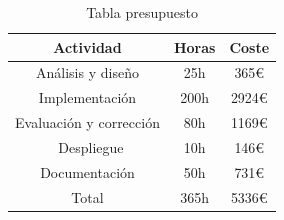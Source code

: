 \begin{table}[!ht]
    \begin{center} 
    \begin{tabular}{| c | c | c |}
    \hline
    \rowcolor{blueice}
    Actividad & Horas & Coste  \\ \hline
    Análisis y diseño & 25h & 365€\\
    Implementación & 200h &  2924€\\
    Evaluación y corrección & 80h & 1169€ \\ \
    Despliegue & 10h & 146€ \\ 
    Documentación & 50h & 731€ \\ \hline
    \rowcolor{gray30}
    Total & 365h & 5336€ \\ \hline
    \end{tabular}
    \caption{Tabla presupuesto}
    \label{tab:presupuesto}
    \end{center}
\end{table}


